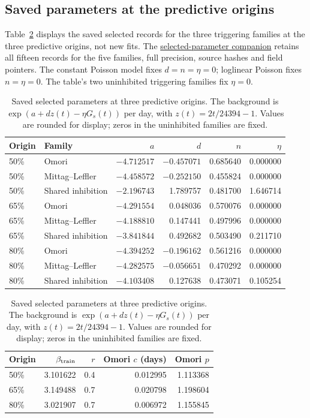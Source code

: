 \subsection{Saved parameters at the predictive origins}\label{sec:saved-fits}
Table~\ref{tab:saved-predictive-parameters} displays the saved selected records for the three triggering families at the three predictive origins, not new fits. The \href{https://github.com/Drefetr/InhibitoryEarthquakeModels/blob/3e76a174cf4f58ce601c6c9640c4d0c11168813f/paper/supplements/predictive_parameters.json}{selected-parameter companion}
 retains all fifteen records for the five families, full precision, source hashes and field pointers. The constant Poisson model fixes \(d=n=\eta=0\); loglinear Poisson fixes \(n=\eta=0\). The table's two uninhibited triggering families fix \(\eta=0\).

\begin{table}[htbp]
\centering\small
\setlength{\tabcolsep}{4pt}
\caption{Saved selected parameters at three predictive origins. The background is \(\exp(a+dz(t)-\eta G_s(t))\) per day, with \(z(t)=2t/24394-1\). Values are rounded for display; zeros in the uninhibited families are fixed.}
\label{tab:saved-predictive-parameters}
\begin{tabular}{llrrrr}
\toprule Origin & Family & \(a\) & \(d\) & \(n\) & \(\eta\) \\ \midrule
50\% & Omori & $-4.712517$ & $-0.457071$ & 0.685640 & 0.000000 \\
50\% & Mittag--Leffler & $-4.458572$ & $-0.252150$ & 0.455824 & 0.000000 \\
50\% & Shared inhibition & $-2.196743$ & 1.789757 & 0.481700 & 1.646714 \\
65\% & Omori & $-4.291554$ & 0.048036 & 0.570076 & 0.000000 \\
65\% & Mittag--Leffler & $-4.188810$ & 0.147441 & 0.497996 & 0.000000 \\
65\% & Shared inhibition & $-3.841844$ & 0.492682 & 0.503490 & 0.211710 \\
80\% & Omori & $-4.394252$ & $-0.196162$ & 0.561216 & 0.000000 \\
80\% & Mittag--Leffler & $-4.282575$ & $-0.056651$ & 0.470292 & 0.000000 \\
80\% & Shared inhibition & $-4.103408$ & 0.127638 & 0.473071 & 0.105254 \\
\bottomrule
\end{tabular}
\par\medskip
\begin{tabular}{lrrrr}
\toprule Origin & \(\beta_{\rm train}\) & \(r\) & Omori \(c\) (days) & Omori \(p\) \\ \midrule
50\% & 3.101622 & 0.4 & 0.012995 & 1.113368 \\
65\% & 3.149488 & 0.7 & 0.020798 & 1.198604 \\
80\% & 3.021907 & 0.7 & 0.006972 & 1.155845 \\
\bottomrule
\end{tabular}
\end{table}

